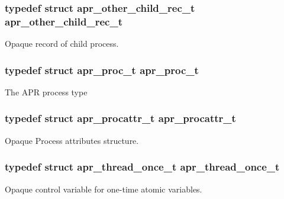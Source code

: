 \subsubsection[{\texorpdfstring{apr\+\_\+other\+\_\+child\+\_\+rec\+\_\+t}{apr_other_child_rec_t}}]{\setlength{\rightskip}{0pt plus 5cm}typedef struct {\bf apr\+\_\+other\+\_\+child\+\_\+rec\+\_\+t} {\bf apr\+\_\+other\+\_\+child\+\_\+rec\+\_\+t}}\hypertarget{group__apr__thread__proc_gafc52ee8b19a7b222278d31ebb3f11a71}{}\label{group__apr__thread__proc_gafc52ee8b19a7b222278d31ebb3f11a71}
Opaque record of child process. 
\subsubsection[{\texorpdfstring{apr\+\_\+proc\+\_\+t}{apr_proc_t}}]{\setlength{\rightskip}{0pt plus 5cm}typedef struct {\bf apr\+\_\+proc\+\_\+t}  {\bf apr\+\_\+proc\+\_\+t}}\hypertarget{group__apr__thread__proc_gada60ec0f833048291d98e66f21f4c4c4}{}\label{group__apr__thread__proc_gada60ec0f833048291d98e66f21f4c4c4}
The A\+PR process type 
\subsubsection[{\texorpdfstring{apr\+\_\+procattr\+\_\+t}{apr_procattr_t}}]{\setlength{\rightskip}{0pt plus 5cm}typedef struct {\bf apr\+\_\+procattr\+\_\+t} {\bf apr\+\_\+procattr\+\_\+t}}\hypertarget{group__apr__thread__proc_ga0d83919a6a0dd609598a864917f8b339}{}\label{group__apr__thread__proc_ga0d83919a6a0dd609598a864917f8b339}
Opaque Process attributes structure. 
\subsubsection[{\texorpdfstring{apr\+\_\+thread\+\_\+once\+\_\+t}{apr_thread_once_t}}]{\setlength{\rightskip}{0pt plus 5cm}typedef struct {\bf apr\+\_\+thread\+\_\+once\+\_\+t} {\bf apr\+\_\+thread\+\_\+once\+\_\+t}}\hypertarget{group__apr__thread__proc_ga91841bcf20d0579e8e6acc6d3c220ac1}{}\label{group__apr__thread__proc_ga91841bcf20d0579e8e6acc6d3c220ac1}
Opaque control variable for one-\/time atomic variables. 
